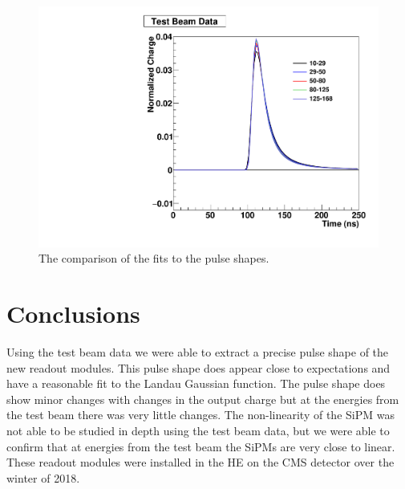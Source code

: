 \begin{figure}
\centering
\includegraphics[width=0.8\linewidth]{Figures/Overlap.pdf}
\caption{The comparison of the fits to the pulse shapes.}
\label{fig:Overlap}
\end{figure}


\section{Conclusions}

Using the test beam data we were able to extract a precise pulse shape of the new readout modules. This pulse shape does appear close to expectations and have a reasonable fit to the Landau Gaussian function. The pulse shape does show minor changes with changes in the output charge but at the energies from the test beam there was very little changes. The non-linearity of the SiPM was not able to be studied in depth using the test beam data, but we were able to confirm that at energies from the test beam the SiPMs are very close to linear. These readout modules were installed in the HE on the CMS detector over the winter of 2018. 

